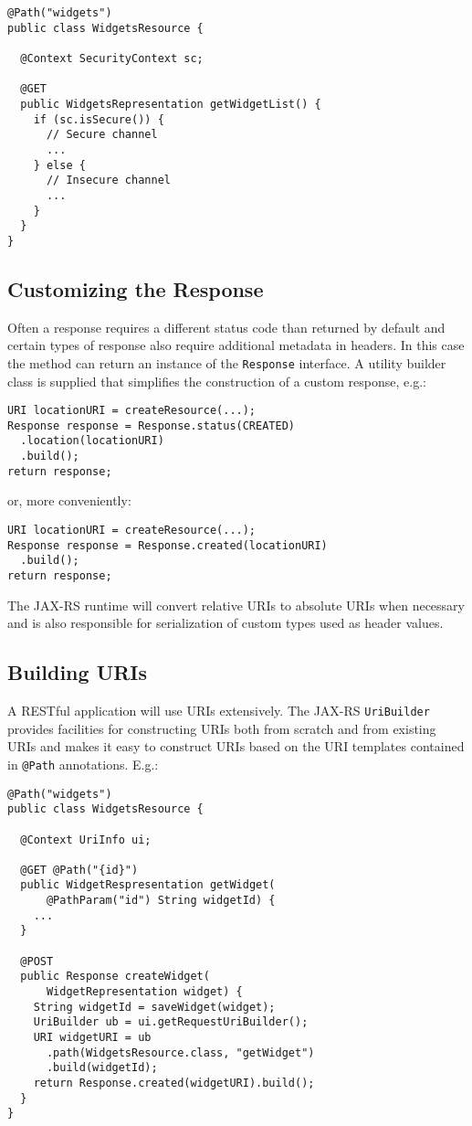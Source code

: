 \documentclass{acm_proc_article-sp}
\begin{document}
\begin{verbatim}
@Path("widgets")
public class WidgetsResource {

  @Context SecurityContext sc;
  
  @GET
  public WidgetsRepresentation getWidgetList() {
    if (sc.isSecure()) {
      // Secure channel
      ...
    } else {
      // Insecure channel
      ...
    }
  }
}
\end{verbatim}

\subsection{Customizing the Response}
\label{customresponse}

Often a response requires a different status code than returned by default and certain types of response also require additional metadata in headers. In this case the method can return an instance of the \texttt{Response} interface. A utility builder class is supplied that simplifies the construction of a custom response, e.g.:

\begin{verbatim}
URI locationURI = createResource(...);
Response response = Response.status(CREATED)
  .location(locationURI)
  .build();
return response;
\end{verbatim}

or, more conveniently:

\begin{verbatim}
URI locationURI = createResource(...);
Response response = Response.created(locationURI)
  .build();
return response;
\end{verbatim}

The JAX-RS runtime will convert relative URIs to absolute URIs when necessary and is also responsible for serialization of custom types used as header values.

\subsection{Building URIs}

A RESTful application will use URIs extensively. The JAX-RS \texttt{UriBuilder} provides facilities for constructing URIs both from scratch and from existing URIs and makes it easy to construct URIs based on the URI templates contained in \texttt{@Path} annotations. E.g.:

\begin{verbatim}
@Path("widgets")
public class WidgetsResource {

  @Context UriInfo ui;
  
  @GET @Path("{id}")
  public WidgetRespresentation getWidget(
      @PathParam("id") String widgetId) {
    ...
  }
    
  @POST
  public Response createWidget(
      WidgetRepresentation widget) {
    String widgetId = saveWidget(widget);
    UriBuilder ub = ui.getRequestUriBuilder();
    URI widgetURI = ub
      .path(WidgetsResource.class, "getWidget")
      .build(widgetId);
    return Response.created(widgetURI).build();
  }
}
\end{verbatim}
\end{document}

